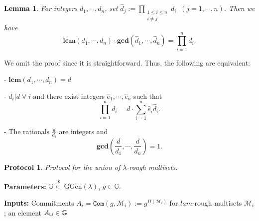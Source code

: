 \documentclass[11pt, lettersize, notitlepage, leqno, footskip=0.6cm]{article}
\newcommand{\pl}{\prod\limits}
\newcommand{\slim}{\sum\limits}
\newcommand{\ttt}{\texttt}
\newcommand{\mc}{\mathcal}
\newcommand{\mb}{\mathbb}
\newcommand{\mbf}{\mathbf}
\newcommand{\mr}{\mathrm}
\newcommand{\lam}{\lambda}
\newcommand{\lamb}{\lambda}
\newcommand{\what}{\widehat}
\newcommand{\vs}{\vspace{-0.15cm}}
\newcommand{\noin}{\noindent}
\newcommand{\LCM}{\mbf{lcm}}
\newcommand{\GCD}{\mbf{gcd}}
\newtheorem{Lem}[Thm]{Lemma}
\newtheorem{Prot}[Thm]{Protocol}
\numberwithin{equation}{section}
\begin{document}
\begin{Lem} For integers $d_1,\cdots,d_n$, set $\what{d}_j:= \pl_{\substack{1\leq i\leq n \\ i\neq j}} d_i \;\;(j=1,\cdots,n)$. Then we have \vspace{-0.2cm} $$ \LCM(d_1,\cdots,d_n)\cdot \GCD(\what{d}_1,\cdots,\what{d}_n) = \pl_{i=1}^n d_i.$$ \end{Lem}

We omit the proof since it is straightforward. Thus, the following are equivalent:\vspace{0.1cm}

\noin - $\LCM(d_1,\cdots,d_n) = d$

\noin - $d_i\big| d\;\forall\; i$ and there exist integers $\what{e}_1,\cdots,\what{e}_n$ such that \vs $$\pl_{i=1}^n d_i  =  d\cdot\slim_{i=1}^n \what{e}_i\what{d}_i.$$

\noin - The rationals $\frac{d}{d_i}$ are integers and \vs $$\GCD(\frac{d}{d_1},\cdots,\frac{d}{d_n}) = 1 .$$

\vspace{0.1cm}

\begin{comment}
Let $p$ be a prime and let $\mr{val}_p(N)$ denote the largest integer $x$ such that $p^x$ divides $N$. Write $k_i:= \mr{val}_p(d_i)$ for brevity. Then $\mr{val}_p(\pl_{i=1}^n d_i) = \slim_{i=1}^n k_i$ and $\mr{val}_p(\what{d}_j) = (\slim_{i=1}^n k_i)-k_i$. Hence, \vs $$\mr{val}_p(\GCD(\what{d}_1,\cdots,\what{d}_n)) = \min\big((\slim_{i=1}^n k_i)-k_i\big)_i = \slim_{i=1}^n k_i - \max(k_1,\cdots,k_n).$$ On the other hand, \vs $$\mr{val}_p(\LCM(d_1,\cdots,d_n)) = \max(k_1,\cdots,k_n).$$ Thus, \vs $$\mr{val}_p(\LCM(d_1,\cdots,d_n))+ \mr{val}_p(\GCD(\what{d}_1,\cdots,\what{d}_n)) = \mr{val}_p(\pl_{i=1}^n d_i),$$ which completes the proof. \end{comment}





\begin{Prot} Protocol for the union of $\lam$-rough multisets.\end{Prot} \vspace{-0.3cm}

\noin \textbf{Parameters:} $\mb{G}\xleftarrow{\$} \mr{GGen}(\lamb)$,\; $g\in \mb{G}$.

\noin \textbf{Inputs:} Commitments $A_i = \ttt{Com}(g, \mc{M}_i) := g^{\Pi(\mc{M}_i)}$ for $lam$-rough multisets $\mc{M}_i$; an element $A_{\tt{\cup}}\in\mb{G}$\vs
\end{document}
